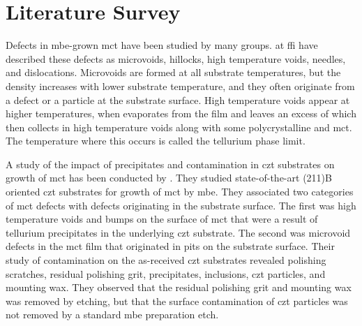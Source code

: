 \section{Literature Survey}%
%
%
%
%
%
Defects in \ac{mbe}-grown \ac{mct} have been studied by many groups. \citet{selvig2007defects, selvig2008defects-a, selvig2008defects-b} at \ac{ffi} have described these defects as microvoids, hillocks, high temperature voids, needles, and dislocations. Microvoids are formed at all substrate temperatures, but the density increases with lower substrate temperature, and they often originate from a defect or a particle at the substrate surface. High temperature voids appear at higher temperatures, when  evaporates from the film and leaves an excess of  which then collects in high temperature voids along with some polycrystalline  and \ac{mct}. The temperature where this occurs is called the tellurium phase limit. 

A study of the impact of precipitates and contamination in \ac{czt} substrates on growth of \ac{mct} has been conducted by \citet{benson2014impact, benson2015as-received, benson2016analysis}. They studied state-of-the-art (211)B oriented \ac{czt} substrates for growth of \ac{mct} by \ac{mbe}. They associated two categories of \ac{mct} defects with defects originating in the substrate surface. The first was high temperature voids and bumps on the surface of \ac{mct} that were a result of tellurium precipitates in the underlying \ac{czt} substrate. The second was microvoid defects in the \ac{mct} film that originated in pits on the substrate surface. Their study of contamination on the as-received \ac{czt} substrates revealed polishing scratches,  residual polishing grit,  precipitates,  inclusions, \ac{czt} particles, and mounting wax. They observed that the residual polishing grit and mounting wax was removed by etching, but that the surface contamination of \ac{czt} particles was not removed by a standard \ac{mbe} preparation etch. %


